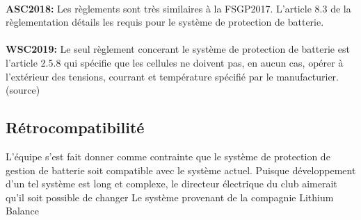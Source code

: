 		\paragraph{}
		\textbf{ASC2018:} Les règlements sont très similaires à la FSGP2017. L'article 8.3 de la règlementation détails les requis pour le système de protection de batterie.
		
		\paragraph{}
		\textbf{WSC2019:} Le seul règlement concerant le système de protection de batterie est l'article 2.5.8 qui spécifie que les cellules ne doivent pas, en aucun cas, opérer à l'extérieur des tensions, courrant et température spécifié par le manufacturier. (source)
	
	
	\subsection{Rétrocompatibilité}
	L'équipe s'est fait donner comme contrainte que le système de protection de gestion de batterie soit compatible avec le système actuel. Puisque développement d'un tel système est long et complexe, le directeur électrique du club aimerait qu'il soit possible de changer 
	Le système provenant de la compagnie Lithium Balance 
	

